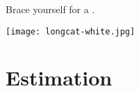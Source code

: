 \documentclass[t]{beamer}
\begin{document}
	
	\begin{frame}[t,plain]
		
		\vspace{.3\paperwidth}
		\begin{center}
			{\Large Brace yourself for a .}
		\end{center}
		
		\vspace{1em}
		\begin{flushright}
			\texttt{[image: longcat-white.jpg]}		
		\end{flushright}

	\end{frame}
	
	\section{Estimation}
	
\end{document}
